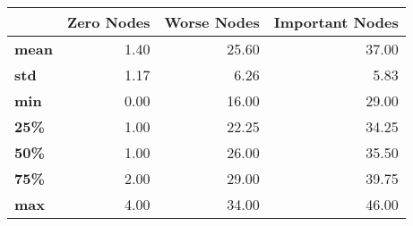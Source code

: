 \begin{tabular}{lrrr}
\toprule
{} &  Zero Nodes &  Worse Nodes &  Important Nodes \\
\midrule
\textbf{mean} &        1.40 &        25.60 &            37.00 \\
\textbf{std } &        1.17 &         6.26 &             5.83 \\
\textbf{min } &        0.00 &        16.00 &            29.00 \\
\textbf{25\% } &        1.00 &        22.25 &            34.25 \\
\textbf{50\% } &        1.00 &        26.00 &            35.50 \\
\textbf{75\% } &        2.00 &        29.00 &            39.75 \\
\textbf{max } &        4.00 &        34.00 &            46.00 \\
\bottomrule
\end{tabular}
